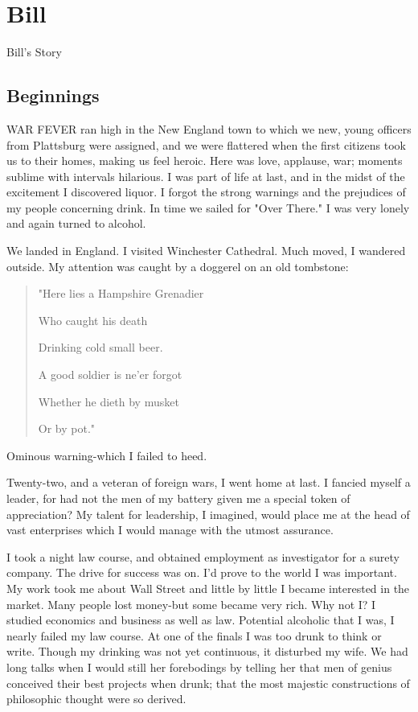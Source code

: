
\section{Bill}

Bill's Story

\subsection{Beginnings}


WAR FEVER ran high in the New England town to which we new, young officers from Plattsburg were assigned, and we were flattered when the first citizens took us to their homes, making us feel heroic.
Here was love, applause, war; moments sublime with intervals hilarious.
I was part of life at last, and in the midst of the excitement I discovered liquor.
I forgot the strong warnings and the prejudices of my people concerning drink.
In time we sailed for "Over There."
I was very lonely and again turned to alcohol.

We landed in England.
I visited Winchester Cathedral.
Much moved, I wandered outside.
My attention was caught by a doggerel on an old tombstone:

\begin{quote}
"Here lies a Hampshire Grenadier

Who caught his death

Drinking cold small beer.

A good soldier is ne'er forgot

Whether he dieth by musket

Or by pot."
\end{quote}

Ominous warning-which I failed to heed.

Twenty-two, and a veteran of foreign wars, I went home at last.
I fancied myself a leader, for had not the men of my battery given me a special token of appreciation?
My talent for leadership, I imagined, would place me at the head of vast enterprises which I would manage with the utmost assurance.

I took a night law course, and obtained employment as investigator for a surety company.
The drive for success was on.
I'd prove to the world I was important.
My work took me about Wall Street and little by little I became interested in the market.
Many people lost money-but some became very rich.
Why not I?
I studied economics and business as well as law.
Potential  alcoholic that I was, I nearly failed my law course.
At one of the finals I was too drunk to think or write.
Though my drinking was not yet continuous, it disturbed my wife.
We had long talks when I would still her forebodings by telling her that men of genius conceived their best projects when drunk; that the most majestic constructions of philosophic thought were so derived.

